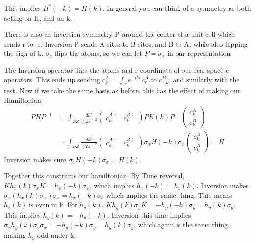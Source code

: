 This implies $H^*(-k) = H(k)$. In general you can think of a symmetry as both acting on H, and on k.

There is also an inversion symmetry P around the center of a unit cell which sends r to -r. Inversion P sends A sites to B sites, and B to A, while also flipping the sign of k. $\sigma_x$ flips the atoms, so we can let $P=\sigma_x$ in our representation. 

The Inversion operator flips the atoms and r coordinate of our real space c operators. This ends up sending $c^A_k = \int_r e^{-ikr}c^A_r$ to $c^B_{-k}$, and similarly with the rest. Now if we take the same basis as before, this has the effect of making our Hamiltonian
\begin{align}
PHP^{-1}&=\int_{BZ}\frac{dk^2}{(2\pi)^2} 
\begin{pmatrix}
c^{A\dag}_k & c^{B\dag}_k
\end{pmatrix}
PH(k)P^{-1}
\begin{pmatrix}
c^{A}_k \\
c^{B}_k
\end{pmatrix} \\
&= \int_{BZ}\frac{dk^2}{(2\pi)^2}
\begin{pmatrix}
c^{A\dag}_k & c^{B\dag}_k
\end{pmatrix}
\sigma_x H(-k) \sigma_x
\begin{pmatrix}
c^{A}_k \\
c^{B}_k
\end{pmatrix}
= H
\end{align}
Inversion makes sure $\sigma_x H(-k) \sigma_x =H(k)$. 

Together this constrains our hamiltonian. By Time reversal, $Kh_x(k) \sigma_xK = h_x(-k)\sigma_x$, which implies $h_x(-k)=h_x(k)$. Inversion makes $\sigma_x (h_x(k) \sigma_x) \sigma_x =h_x(-k)\sigma_x$ which implies the same thing. This means $h_x(k)$ is even in k. For $h_y(k)$, $K h_y(k) \sigma_y K =-h_y(-k)\sigma_y= h_y(k)\sigma_y$. This implies $h_y(k) = -h_y(-k)$. Inversion this time implies  $\sigma_x h_y(k) \sigma_y \sigma_x =-h_y(-k)\sigma_y=  h_y(k)\sigma_y$, which again is the same thing, making $h_y$ odd under k.

